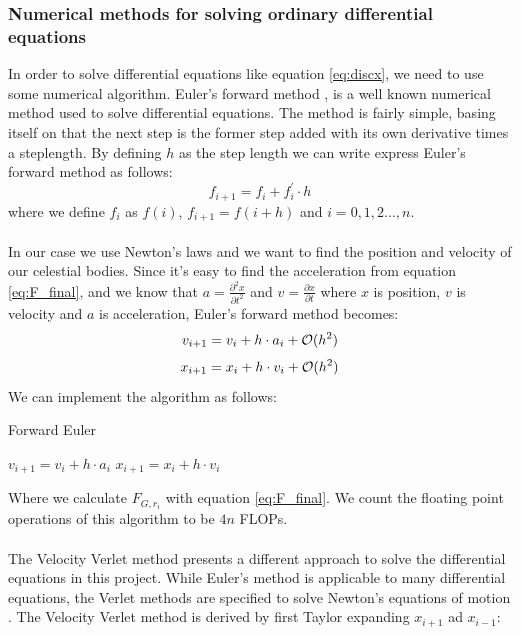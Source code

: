 \documentclass{article}
\begin{document}
\subsubsection{Numerical methods for solving ordinary differential equations}
In order to solve differential equations like equation \eqref{eq:discx}, we need to use some numerical algorithm. Euler's forward method \cite{Euler}, is a well known numerical method used to solve differential equations. The method is fairly simple, basing itself on that the next step is the former step added with its own derivative times a steplength. By defining $h$ as the step length we can write express Euler's forward method as follows:
\begin{equation}
f_{i + 1} = f_i + f^{'}_i \cdot h
\label{eq:fwdEuler}
\end{equation}
where we define $f_i$ as $f(i)$, $f_{i+1} = f(i + h)$ and $i = 0, 1, 2 ... , n$. \\\\
In our case we use Newton's laws and we want to find the position and velocity of our celestial bodies. Since it's easy to find the acceleration from equation \eqref{eq:F_final}, and we know that $a = \frac{\partial^2 x}{\partial t^2}$ and $v = \frac{\partial x}{\partial t}$ where $x$ is position, $v$ is velocity and $a$ is acceleration, Euler's forward method becomes:
\begin{equation}
v_{i + 1} = v_i + h \cdot a_i + \mathcal{O}(h^2)\\
\label{eq:Eulervel}
\end{equation}
\begin{equation}
x_{i + 1} = x_i + h \cdot v_i + \mathcal{O}(h^2)\\
\label{eq:Eulerpos}
\end{equation}
We can implement the algorithm as follows:
\begin{algorithm}[H]
\small
\caption{Forward Euler}\label{alg:VelVerlet}
\begin{algorithmic}[1]
\State $v_{i+1} = v_i + h\cdot a_i $
\State $x_{i+1} = x_i + h\cdot v_i $
\EndFor
\end{algorithmic}
\end{algorithm}
Where we calculate $F_{G, r_i}$ with equation \eqref{eq:F_final}. We count the floating point operations of this algorithm to be $4n$ FLOPs. \\ \\
The Velocity Verlet method presents a different approach to solve the differential equations in this project. While Euler's method is applicable to many differential equations, the Verlet methods are specified to solve Newton's equations of motion \cite{Newton}. The Velocity Verlet method is derived by first Taylor expanding $x_{i + 1}$ ad $x_{i-1}$:
\end{document}

